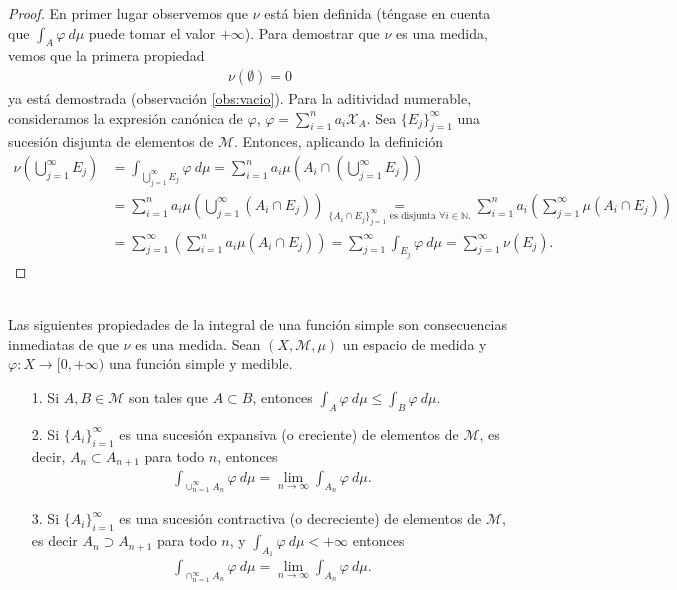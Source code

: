 \begin{proof}
En primer lugar observemos que $\nu$ está bien definida (téngase en cuenta que $\int_{A}{\varphi \ d\mu}$ puede tomar el valor $+\infty$). Para demostrar que $\nu$ es una medida, vemos que la primera propiedad
\begin{align*}
    \nu(\emptyset) = 0
\end{align*}
ya está demostrada (observación \ref{obs:vacio}). Para la aditividad numerable, consideramos la expresión canónica de $\varphi$, $\varphi = \sum_{i=1}^{n}{a_i \mathcal{X}_A}$. Sea $\{ E_j \}_{j=1}^{\infty}$ una sucesión disjunta de elementos de $\mathcal{M}$. Entonces, aplicando la definición
\begin{align*}
    \nu\left( \bigcup_{j=1}^{\infty}{E_j}\right) &= \int_{\bigcup_{j=1}^{\infty}{E_j}}{\varphi \ d\mu} = \sum_{i=1}^{n}{a_i\mu\left( A_i \cap \left( \bigcup_{j=1}^{\infty}{E_j} \right) \right)} \\
    &= \sum_{i=1}^{n}{a_i\mu\left( \bigcup_{j=1}^{\infty}{(A_i \cap E_j)}\right)} \underset{\{ A_i \cap E_j\}_{j=1}^{\infty} \text{ es disjunta } \forall i \in \mathbb{N}.}{=} \sum_{i=1}^{n}{a_i\left( \sum_{j=1}^{\infty}{\mu(A_i \cap E_j)}\right)}\\
    &= \sum_{j=1}^{\infty}{\left( \sum_{i=1}^{n}{a_i\mu(A_i \cap E_j)} \right)} = \sum_{j=1}^{\infty}{\int_{E_j}{\varphi \ d\mu}} = \sum_{j=1}^{\infty}{\nu(E_j)}.
\end{align*}
\end{proof}
\\
\newline
Las siguientes propiedades de la integral de una función simple son consecuencias inmediatas de que $\nu$ es una medida. Sean $(X, \mathcal{M}, \mu)$ un espacio de medida y $\varphi: X \longrightarrow [0,+\infty)$ una función simple y medible.
\begin{enumerate}
    \item[1.] Si $A,B \in \mathcal{M}$ son tales que $A \subset B$, entonces $\int_{A}{\varphi \ d\mu} \leq \int_{B}{\varphi \ d\mu}$.
    \item[2.] Si $\{ A_i \}_{i=1}^{\infty}$ es una sucesión expansiva (o creciente) de elementos de $\mathcal{M}$, es decir, $A_n \subset A_{n+1}$ para todo $n$, entonces
    \begin{align*}
        \int_{\cup_{n=1}^{\infty}{A_n}}{\varphi \ d\mu} = \lim_{n \to \infty}{\int_{A_n}{\varphi \ d\mu}}.
    \end{align*}
    \item[3.] Si $\{ A_i \}_{i=1}^{\infty}$ es una sucesión contractiva (o decreciente) de elementos de $\mathcal{M}$, es decir $A_n \supset A_{n+1}$ para todo $n$, y $\int_{A_1}{\varphi \ d\mu} < +\infty$ entonces
    \begin{align*}
        \int_{\cap_{n=1}^{\infty}{A_n}}{\varphi \ d\mu} = \lim_{n \to \infty}{\int_{A_n}{\varphi \ d\mu}}.
    \end{align*}
\end{enumerate}

